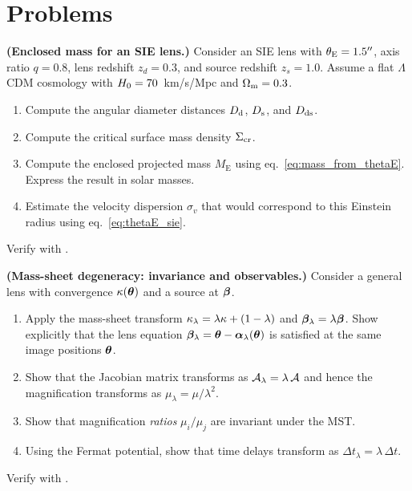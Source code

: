\section{Problems}
\label{sec:galaxy_lensing_problems}

\begin{exercise}
\label{ex:sie_mass}
\textbf{(Enclosed mass for an SIE lens.)}
Consider an SIE lens with $\theta_{\mathrm{E}} = 1.5''$, axis ratio $q = 0.8$,
lens redshift $z_d = 0.3$, and source redshift $z_s = 1.0$.
Assume a flat $\Lambda$CDM cosmology with $H_0 = 70$~km/s/Mpc
and $\Omega_{\mathrm{m}} = 0.3$.
\begin{enumerate}[label=(\alph*)]
    \item Compute the angular diameter distances $D_{\mathrm{d}}$, $D_{\mathrm{s}}$, and
          $D_{\mathrm{ds}}$.
    \item Compute the critical surface mass density $\Sigma_{\mathrm{cr}}$.
    \item Compute the enclosed projected mass $M_{\mathrm{E}}$ using
          eq.~\eqref{eq:mass_from_thetaE}.  Express the result in
          solar masses.
    \item Estimate the velocity dispersion $\sigma_v$ that would
          correspond to this Einstein radius using
          eq.~\eqref{eq:thetaE_sie}.
\end{enumerate}
Verify with
.
\end{exercise}

\begin{exercise}
\label{ex:msd_derivation}
\textbf{(Mass-sheet degeneracy: invariance and observables.)}
Consider a general lens with convergence $\kappa(\boldsymbol{\theta})$ and a
source at $\boldsymbol{\beta}$.
\begin{enumerate}[label=(\alph*)]
    \item Apply the mass-sheet transform
          $\kappa_\lambda = \lambda\kappa + (1-\lambda)$ and
          $\boldsymbol{\beta}_\lambda = \lambda\boldsymbol{\beta}$.  Show explicitly that
          the lens equation
          $\boldsymbol{\beta}_\lambda = \boldsymbol{\theta} -
          \boldsymbol{\alpha}_\lambda(\boldsymbol{\theta})$ is satisfied at the same image
          positions $\boldsymbol{\theta}$.
    \item Show that the Jacobian matrix transforms as
          $\mathcal{A}_\lambda = \lambda\,\mathcal{A}$ and hence the
          magnification transforms as
          $\mu_\lambda = \mu/\lambda^2$.
    \item Show that magnification \textit{ratios}
          $\mu_i/\mu_j$ are invariant under the MST.
    \item Using the Fermat potential, show that time delays
          transform as $\Delta t_\lambda = \lambda\,\Delta t$.
\end{enumerate}
Verify with
.
\end{exercise}

